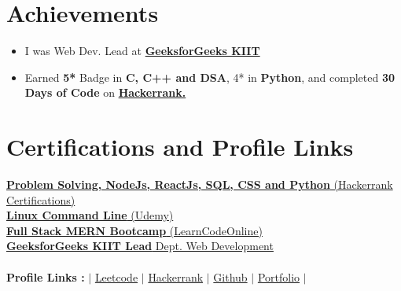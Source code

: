 \documentclass[letterpaper,11pt]{article}
\newcommand{\resumeItem}[2]{
  \item\small{
    \textbf{#1}{ #2 \vspace{-2pt}}
  }
}
\newcommand{\resumeSubHeadingListStart}{\begin{itemize}[leftmargin=*]}
\newcommand{\resumeSubHeadingListEnd}{\end{itemize}}
\newcommand{\resumeItemListStart}{\begin{itemize}}
\newcommand{\resumeItemListEnd}{\end{itemize}\vspace{-5pt}}
\begin{document}
\section{Achievements}
 \resumeSubHeadingListStart
    	\resumeItem{}{I was Web Dev. Lead at \href{https://gfgkiit.netlify.app/}{\bf GeeksforGeeks KIIT}}
    	
    	\resumeItem{}{Earned \textbf{5*} Badge in \textbf{C, C++ and DSA},  4* in \textbf{Python}, and completed \textbf{30 Days of Code} on  {\href{https://www.hackerrank.com/satyajeetramnit1?hr_r=1}{\bf Hackerrank.}}}
 \resumeSubHeadingListEnd
 

\section{Certifications and Profile Links}
 \begin{itemize}[leftmargin=0.15in, label={}]
	\small{\item{
		\href{https://www.hackerrank.com/certificates/8c1ecb8ffd40}{\textbf{Problem Solving, NodeJs, ReactJs, SQL, CSS and Python} (Hackerrank Certifications)} \\
 	    \href{https://www.udemy.com/certificate/UC-ccf367dd-b692-405e-94c2-b67eeebd693d/}{\textbf{Linux Command Line} (Udemy)} \\
      \href{https://drive.google.com/file/d/16q_hy_uXJ3_Wx2DnA3NZALC5zqLaSTZs/view}{\textbf{Full Stack MERN Bootcamp} (LearnCodeOnline)} \\
 	    \href{https://drive.google.com/file/d/1TTGRI2AzBL_3gYKKtnOnh9yId2DWm_5P/view}{\textbf{GeeksforGeeks KIIT Lead}{ Dept. Web Development}} \\
 	    \  \ \\
 	    \textbf{Profile Links :}{ $|$ \href{https://leetcode.com/AnkitRajCodes/}{{Leetcode}} $|$ \href{https://www.hackerrank.com/AnkitRajCodes}{{Hackerrank}} $|$ \href{https://github.com/AnkitRajCode}{{Github}} $|$ \href{https://ankitraj.pages.dev}{{Portfolio}} $|$} \\
	}}
 \end{itemize}
 \vspace{-16pt}
 
\end{document}

